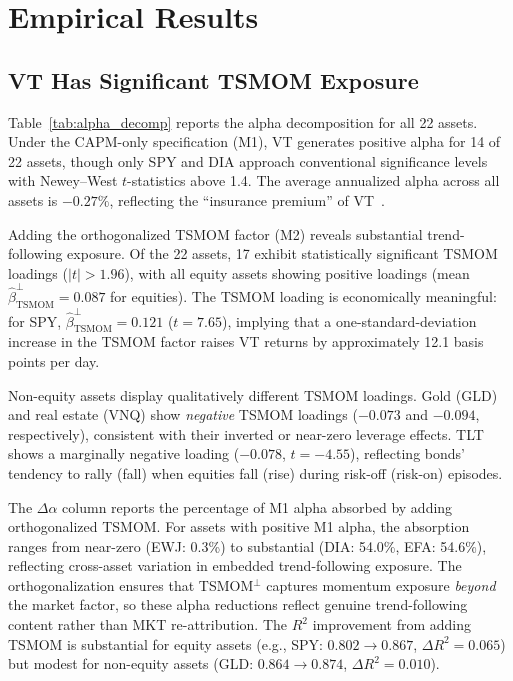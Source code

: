 \section{Empirical Results}

\subsection{VT Has Significant TSMOM Exposure}

Table~\ref{tab:alpha_decomp} reports the alpha decomposition for all 22 assets. Under the CAPM-only specification (M1), VT generates positive alpha for 14 of 22 assets, though only SPY and DIA approach conventional significance levels with Newey--West $t$-statistics above 1.4. The average annualized alpha across all assets is $-0.27\%$, reflecting the ``insurance premium'' of VT~\citep{lai2026a}.

Adding the orthogonalized TSMOM factor (M2) reveals substantial trend-following exposure. Of the 22 assets, 17 exhibit statistically significant TSMOM loadings ($|t| > 1.96$), with all equity assets showing positive loadings (mean $\hat{\beta}_{\text{TSMOM}}^{\perp} = 0.087$ for equities). The TSMOM loading is economically meaningful: for SPY, $\hat{\beta}_{\text{TSMOM}}^{\perp} = 0.121$ ($t = 7.65$), implying that a one-standard-deviation increase in the TSMOM factor raises VT returns by approximately 12.1 basis points per day.

Non-equity assets display qualitatively different TSMOM loadings. Gold (GLD) and real estate (VNQ) show \textit{negative} TSMOM loadings ($-0.073$ and $-0.094$, respectively), consistent with their inverted or near-zero leverage effects. TLT shows a marginally negative loading ($-0.078$, $t = -4.55$), reflecting bonds' tendency to rally (fall) when equities fall (rise) during risk-off (risk-on) episodes.

The $\Delta\alpha$ column reports the percentage of M1 alpha absorbed by adding orthogonalized TSMOM. For assets with positive M1 alpha, the absorption ranges from near-zero (EWJ: 0.3\%) to substantial (DIA: 54.0\%, EFA: 54.6\%), reflecting cross-asset variation in embedded trend-following exposure. The orthogonalization ensures that TSMOM$^{\perp}$ captures momentum exposure \textit{beyond} the market factor, so these alpha reductions reflect genuine trend-following content rather than MKT re-attribution. The $R^2$ improvement from adding TSMOM is substantial for equity assets (e.g., SPY: $0.802 \to 0.867$, $\Delta R^2 = 0.065$) but modest for non-equity assets (GLD: $0.864 \to 0.874$, $\Delta R^2 = 0.010$).

